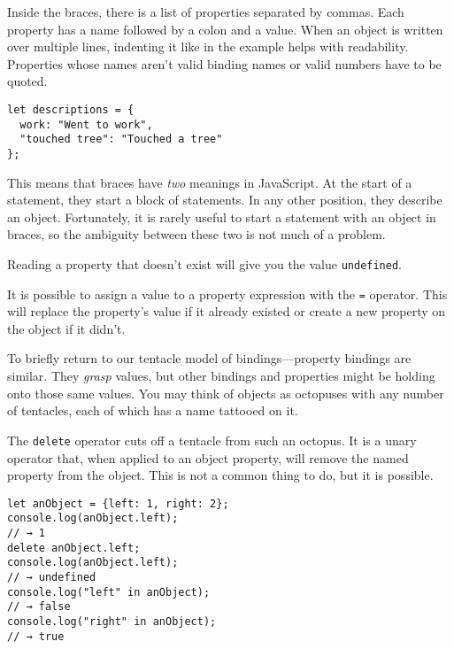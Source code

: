 Inside the braces, there is a list of properties separated by commas. Each property has a name followed by a colon and a value. When an object is written over multiple lines, indenting it like in the example helps with readability. Properties whose names aren't valid binding names or valid numbers have to be quoted.

\begin{lstlisting}
let descriptions = {
  work: "Went to work",
  "touched tree": "Touched a tree"
};
\end{lstlisting}
\noindent{}

This means that braces have \emph{two} meanings in JavaScript. At the start of a statement, they start a block of statements. In any other position, they describe an object. Fortunately, it is rarely useful to start a statement with an object in braces, so the ambiguity between these two is not much of a problem.

Reading a property that doesn't exist will give you the value \lstinline`undefined`.

It is possible to assign a value to a property expression with the \lstinline`=` operator. This will replace the property's value if it already existed or create a new property on the object if it didn't.

To briefly return to our tentacle model of bindings—property bindings are similar. They \emph{grasp} values, but other bindings and properties might be holding onto those same values. You may think of objects as octopuses with any number of tentacles, each of which has a name tattooed on it.

The \lstinline`delete` operator cuts off a tentacle from such an octopus. It is a unary operator that, when applied to an object property, will remove the named property from the object. This is not a common thing to do, but it is possible.

\begin{lstlisting}
let anObject = {left: 1, right: 2};
console.log(anObject.left);
// → 1
delete anObject.left;
console.log(anObject.left);
// → undefined
console.log("left" in anObject);
// → false
console.log("right" in anObject);
// → true
\end{lstlisting}
\noindent{}

